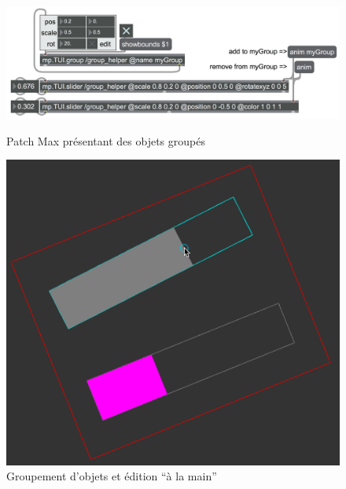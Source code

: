 \begin{figure}[!htbp]
	\captionsetup{format=plain}%
	\centering
	\begin{minipage}[t]{0.48\textwidth}
		\includegraphics[width=\linewidth]{gfx/06_visual_representation/mpTUI_groups_patcher.png}
		\caption{Patch Max présentant des objets groupés}
		\label{fig:visual_representation:groups_patch}
	\end{minipage}
	\hspace{.02\linewidth}
	\begin{minipage}[t]{0.48\textwidth}
	    \includegraphics[width=\linewidth]{gfx/06_visual_representation/mpTUI_groups.png}
		\caption{Groupement d'objets et édition ``à la main''}
		\label{fig:visual_representation:groups}
	\end{minipage}
\end{figure}


